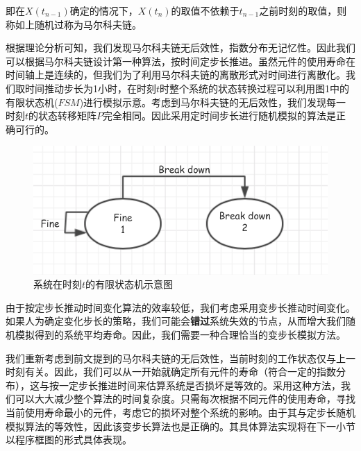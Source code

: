 \documentclass[10.5pt,twocolumn]{jbuaa}
\begin{document}
即在$X(t_{n - 1})$确定的情况下，$X(t_n)$的取值不依赖于$t_{n - 1}$之前时刻的取值，则称如上随机过称为马尔科夫链。

根据理论分析可知，我们发现马尔科夫链无后效性，指数分布无记忆性。因此我们可以根据马尔科夫链设计第一种算法，按时间定步长推进。虽然元件的使用寿命在时间轴上是连续的，但我们为了利用马尔科夫链的离散形式对时间进行离散化。我们取时间推动步长为1小时，在时刻$t$时整个系统的状态转换过程可以利用图1中的有限状态机($FSM$)进行模拟示意。考虑到马尔科夫链的无后效性，我们发现每一时刻$t$的状态转移矩阵$P$完全相同。因此采用定时间步长进行随机模拟的算法是正确可行的。

\begin{figure}[H]
\centering
	\includegraphics[scale = 0.5]{fig1}
	\caption{系统在时刻$t$的有限状态机示意图}
\end{figure}

由于按定步长推动时间变化算法的效率较低，我们考虑采用变步长推动时间变化。如果人为确定变化步长的策略，我们可能会\textbf{错过}系统失效的节点，从而增大我们随机模拟得到的系统平均寿命。因此，我们需要一种合理恰当的变步长模拟方法。

我们重新考虑到前文提到的马尔科夫链的无后效性，当前时刻的工作状态仅与上一时刻有关。因此，我们可以从一开始就确定所有元件的寿命（符合一定的指数分布），这与按一定步长推进时间来估算系统是否损坏是等效的。采用这种方法，我们可以大大减少整个算法的时间复杂度。只需每次根据不同元件的使用寿命，寻找当前使用寿命最小的元件，考虑它的损坏对整个系统的影响。由于其与定步长随机模拟算法的等效性，因此该变步长算法也是正确的。其具体算法实现将在下一小节以程序框图的形式具体表现。
\end{document}
